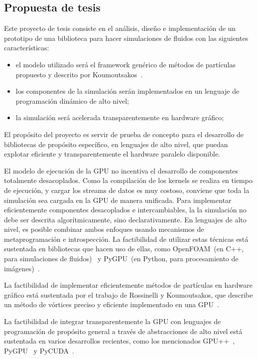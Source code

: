 \documentclass[11pt,spanish]{article}
\begin{document}
\subsection{Propuesta de tesis}
Este proyecto de tesis consiste en el análisis, diseño e implementación de un
prototipo de una biblioteca para hacer simulaciones de fluidos con las
siguientes características:
\begin{itemize}
    \item el modelo utilizado será el framework genérico de métodos de
       partículas propuesto y descrito por Koumoutsakos~\cite{multiscale}.
    \item los componentes de la simulación serán implementados en un lenguaje de
        programación dinámico de alto nivel;
    \item la simulación será acelerada transparentemente en hardware gráfico;
\end{itemize}
El propósito del proyecto es servir de prueba de concepto para el
desarrollo de bibliotecas de propósito específico, en lenguajes de alto nivel,
que puedan explotar eficiente y transparentemente el hardware paralelo disponible.



El modelo de ejecución de la GPU no incentiva el desarrollo de componentes
totalmente desacoplados.  Como la compilación de los kernels se realiza en tiempo
de ejecución, y cargar los streams de datos es muy costoso, conviene
que toda la simulación sea cargada en la GPU de manera unificada.  Para
implementar eficientemente componentes desacoplados e intercambiables, la
la simulación no debe ser descrita algorítmicamente, sino declarativamente.  En
lenguajes de alto nivel, es posible combinar ambos enfoques usando mecanismos de
metaprogramación e introspección.  La factibilidad de utilizar estas técnicas
está sustentada en bibliotecas que hacen uso de ellas, como OpenFOAM~(en C++,
para simulaciones de fluidos)~\cite{openfoam} y PyGPU~(en Python, para
procesamiento de imágenes)~\cite{pygpu}.

La factibilidad de implementar eficientemente métodos de partículas en hardware
gráfico está sustentada por el trabajo de Rossinelli y Koumoutsakos, que
describe un método de vórtices preciso y eficiente implementado en una
GPU~\cite{vortex-gpu}.

La factibilidad de integrar transparentemente la GPU con lenguajes de
programación de propósito general a través de abstracciones de alto nivel está
sustentada en varios desarrollos recientes, como los mencionados
GPU++~\cite{gpupp}, PyGPU~\cite{pygpu} y PyCUDA~\cite{pycuda}.
\end{document}
